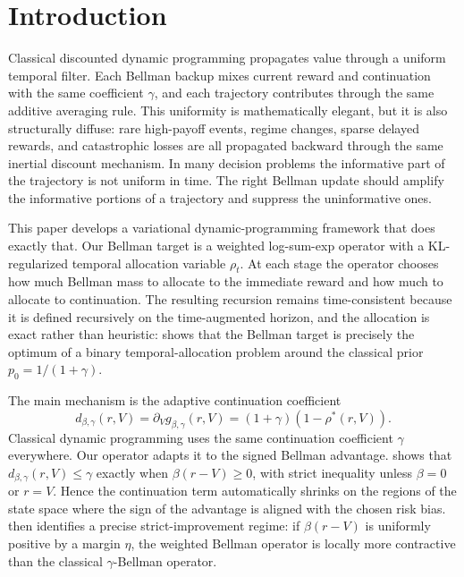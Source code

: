 \documentclass{article}
\theoremstyle{remark}
\begin{document}
\section{Introduction}
\label{sec:intro}

Classical discounted dynamic programming propagates value through a uniform temporal filter. Each Bellman backup mixes current reward and continuation with the same coefficient $\gamma$, and each trajectory contributes through the same additive averaging rule. This uniformity is mathematically elegant, but it is also structurally diffuse: rare high-payoff events, regime changes, sparse delayed rewards, and catastrophic losses are all propagated backward through the same inertial discount mechanism. In many decision problems the informative part of the trajectory is not uniform in time. The right Bellman update should amplify the informative portions of a trajectory and suppress the uninformative ones.

This paper develops a variational dynamic-programming framework that does exactly that. Our Bellman target is a weighted log-sum-exp operator with a KL-regularized temporal allocation variable $\rho_t$. At each stage the operator chooses how much Bellman mass to allocate to the immediate reward and how much to allocate to continuation. The resulting recursion remains time-consistent because it is defined recursively on the time-augmented horizon, and the allocation is exact rather than heuristic:  shows that the Bellman target is precisely the optimum of a binary temporal-allocation problem around the classical prior $p_0=1/(1+\gamma)$.

The main mechanism is the adaptive continuation coefficient
\[
d_{\beta,\gamma}(r,V) = \partial_V g_{\beta,\gamma}(r,V) = (1+\gamma)(1-\rho^*(r,V)).
\]
Classical dynamic programming uses the same continuation coefficient $\gamma$ everywhere. Our operator adapts it to the signed Bellman advantage.  shows that $d_{\beta,\gamma}(r,V)\le \gamma$ exactly when $\beta(r-V)\ge 0$, with strict inequality unless $\beta=0$ or $r=V$. Hence the continuation term automatically shrinks on the regions of the state space where the sign of the advantage is aligned with the chosen risk bias.  then identifies a precise strict-improvement regime: if $\beta(r-V)$ is uniformly positive by a margin $\eta$, the weighted Bellman operator is locally more contractive than the classical $\gamma$-Bellman operator.
\end{document}

